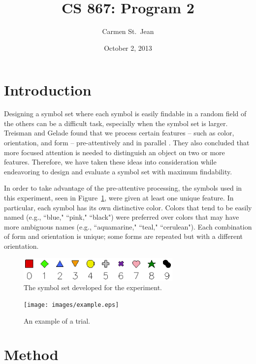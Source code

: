 \documentclass{article} %
\begin{document}
\title{CS 867: Program 2}
\date{October 2, 2013}
\author{Carmen St.\ Jean}

\maketitle

\section{Introduction}
Designing a symbol set where each symbol is easily findable in a random field of the others can be a difficult task, especially when the symbol set is larger.  Treisman and Gelade found that we process certain features -- such as color, orientation, and form -- pre-attentively and in parallel \cite{treisman80}.  They also concluded that more focused attention is needed to distinguish an object on two or more features.  Therefore, we have taken these ideas into consideration while endeavoring to design and evaluate a symbol set with maximum findability.

In order to take advantage of the pre-attentive processing, the symbols used in this experiment, seen in Figure~\ref{fig:symbolSet}, were given at least one unique feature.  In particular, each symbol has its own distinctive color.  Colors that tend to be easily named (e.g., ``blue," ``pink," ``black") were preferred over colors that may have more ambiguous names (e.g., ``aquamarine," ``teal," ``cerulean").  Each combination of form and orientation is unique; some forms are repeated but with a different orientation.

\begin{figure}[htb]
\centering
	\includegraphics[width=8cm]{images/symbolset.eps}
	\caption{The symbol set developed for the experiment.}
	\label{fig:symbolSet}
\end{figure}



\begin{figure}
\centering
	\texttt{[image: images/example.eps]}
	\caption{An example of a trial.}
	\label{fig:trialExample}
\end{figure}

\section{Method}
\end{document}
